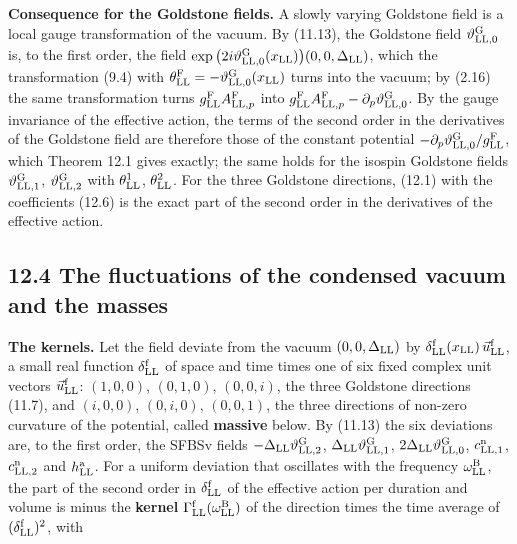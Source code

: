 \documentclass[
  10pt,
]{article}
\begin{document}
\textbf{Consequence for the Goldstone fields.} A slowly varying
Goldstone field is a local gauge transformation of the vacuum. By
(11.13), the Goldstone field \(\vartheta^{\rm G}_{{\rm LL},0}\) is, to
the first order, the field
\(\exp\big(2i\vartheta^{\rm G}_{{\rm LL},0}(x_{\rm LL})\big)(0,0,\Delta_{\rm LL})\),
which the transformation (9.4) with
\(\theta^{\rm F}_{\rm LL}=-\vartheta^{\rm G}_{{\rm LL},0}(x_{\rm LL})\)
turns into the vacuum; by (2.16) the same transformation turns
\(g^{\rm F}_{\rm LL}A^{\rm F}_{{\rm LL},p}\) into
\(g^{\rm F}_{\rm LL}A^{\rm F}_{{\rm LL},p}-\partial_p\vartheta^{\rm G}_{{\rm LL},0}\).
By the gauge invariance of the effective action, the terms of the second
order in the derivatives of the Goldstone field are therefore those of
the constant potential
\(-\partial_p\vartheta^{\rm G}_{{\rm LL},0}/g^{\rm F}_{\rm LL}\), which
Theorem 12.1 gives exactly; the same holds for the isospin Goldstone
fields \(\vartheta^{\rm G}_{{\rm LL},1}\),
\(\vartheta^{\rm G}_{{\rm LL},2}\) with \(\theta^1_{\rm LL}\),
\(\theta^2_{\rm LL}\). For the three Goldstone directions, (12.1) with
the coefficients (12.6) is the exact part of the second order in the
derivatives of the effective action.

\hypertarget{the-fluctuations-of-the-condensed-vacuum-and-the-masses}{%
\subsection{12.4 The fluctuations of the condensed vacuum and the
masses}\label{the-fluctuations-of-the-condensed-vacuum-and-the-masses}}

\textbf{The kernels.} Let the field deviate from the vacuum
\((0,0,\Delta_{\rm LL})\) by
\(\delta^{\rm f}_{\rm LL}(x_{\rm LL})\,\vec u^{\rm f}_{\rm LL}\), a
small real function \(\delta^{\rm f}_{\rm LL}\) of space and time times
one of six fixed complex unit vectors \(\vec u^{\rm f}_{\rm LL}\):
\((1,0,0)\), \((0,1,0)\), \((0,0,i)\), the three Goldstone directions
(11.7), and \((i,0,0)\), \((0,i,0)\), \((0,0,1)\), the three directions
of non-zero curvature of the potential, called \textbf{massive} below.
By (11.13) the six deviations are, to the first order, the SFBSv fields
\(-\Delta_{\rm LL}\vartheta^{\rm G}_{{\rm LL},2}\),
\(\Delta_{\rm LL}\vartheta^{\rm G}_{{\rm LL},1}\),
\(2\Delta_{\rm LL}\vartheta^{\rm G}_{{\rm LL},0}\),
\(c^{\rm n}_{{\rm LL},1}\), \(c^{\rm n}_{{\rm LL},2}\) and
\(h^{\rm a}_{\rm LL}\). For a uniform deviation that oscillates with the
frequency \(\omega^{\rm B}_{\rm LL}\), the part of the second order in
\(\delta^{\rm f}_{\rm LL}\) of the effective action per duration and
volume is minus the \textbf{kernel}
\(\Gamma^{\rm f}_{\rm LL}(\omega^{\rm B}_{\rm LL})\) of the direction
times the time average of \((\delta^{\rm f}_{\rm LL})^2\), with
\end{document}

